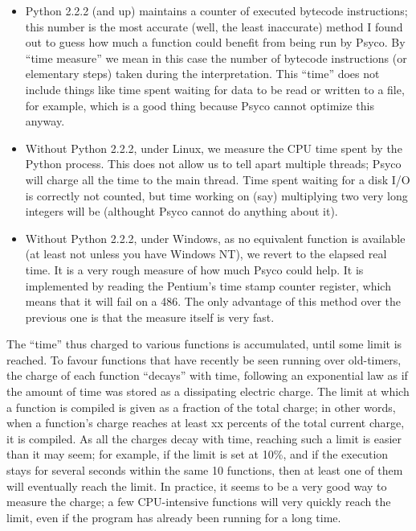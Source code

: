 \documentclass{manual}
\begin{document}
\begin{itemize}
  
\item Python 2.2.2 (and up) maintains a counter of executed bytecode instructions; this number is the most accurate (well, the least inaccurate) method I found out to guess how much a function could benefit from being run by Psyco.  By ``time measure'' we mean in this case the number of bytecode instructions (or elementary steps) taken during the interpretation.  This ``time'' does not include things like time spent waiting for data to be read or written to a file, for example, which is a good thing because Psyco cannot optimize this anyway.

\item Without Python 2.2.2, under Linux, we measure the CPU time spent by the Python process.  This does not allow us to tell apart multiple threads; Psyco will charge all the time to the main thread.  Time spent waiting for a disk I/O is correctly not counted, but time working on (say) multiplying two very long integers will be (althought Psyco cannot do anything about it).
  
\item Without Python 2.2.2, under Windows, as no equivalent function is available (at least not unless you have Windows NT), we revert to the elapsed real time.  It is a very rough measure of how much Psyco could help.  It is implemented by reading the Pentium's time stamp counter register, which means that it will fail on a 486.  The only advantage of this method over the previous one is that the measure itself is very fast.

\end{itemize}

The ``time'' thus charged to various functions is accumulated, until some limit is reached.  To favour functions that have recently be seen running over old-timers, the charge of each function ``decays'' with time, following an exponential law as if the amount of time was stored as a dissipating electric charge.  The limit at which a function is compiled is given as a fraction of the total charge; in other words, when a function's charge reaches at least xx percents of the total current charge, it is compiled.  As all the charges decay with time, reaching such a limit is easier than it may seem; for example, if the limit is set at 10\%, and if the execution stays for several seconds within the same 10 functions, then at least one of them will eventually reach the limit.  In practice, it seems to be a very good way to measure the charge; a few CPU-intensive functions will very quickly reach the limit, even if the program has already been running for a long time.
\end{document}
